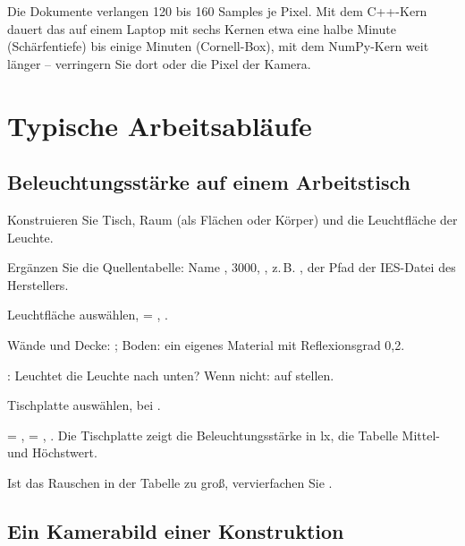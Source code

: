 Die Dokumente verlangen 120 bis 160 Samples je Pixel. Mit dem C++-Kern dauert das auf einem
Laptop mit sechs Kernen etwa eine halbe Minute (Schärfentiefe) bis einige Minuten (Cornell-Box),
mit dem NumPy-Kern weit länger -- verringern Sie dort  oder die Pixel der Kamera.

\section{Typische Arbeitsabläufe}\label{sec:pt-ablaeufe}

\subsection{Beleuchtungsstärke auf einem Arbeitstisch}

\begin{schritte}
  \item Konstruieren Sie Tisch, Raum (als Flächen oder Körper) und die Leuchtfläche der Leuchte.
  \item Ergänzen Sie die Quellentabelle: Name ,  3000,  ,
     z.\,B. ,  der Pfad der
    IES-Datei des Herstellers.
  \item Leuchtfläche auswählen,  = ,
    .
  \item Wände und Decke: ; Boden: ein eigenes Material mit Reflexionsgrad 0{,}2.
  \item {}: Leuchtet die Leuchte nach unten? Wenn nicht:  auf
     stellen.
  \item Tischplatte auswählen, bei  .
  \item {} = ,  = ,
    . Die Tischplatte zeigt die Beleuchtungsstärke in lx, die Tabelle Mittel- und
    Höchstwert.
  \item Ist das Rauschen in der Tabelle zu groß, vervierfachen Sie .
\end{schritte}

\subsection{Ein Kamerabild einer Konstruktion}

